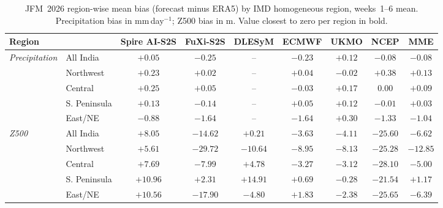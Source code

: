     \begin{table}[t]\centering
    \footnotesize
    \setlength{\tabcolsep}{3pt}
    \caption{JFM~2026 region-wise mean bias (forecast minus ERA5) by IMD homogeneous region, weeks~1--6 mean. Precipitation bias in mm\,day$^{-1}$; Z500 bias in m. Value closest to zero per region in bold.}
    \label{tab:reg_bias}
    \begin{tabular}{llccccccc}\toprule
    Region & & Spire AI-S2S & FuXi-S2S & DLESyM & ECMWF & UKMO & NCEP & MME \\
    \midrule
    \multirow{5}{*}{\emph{Precipitation}} & All India    & $\mathbf{+0.05}$ & $-0.25$ & -- & $-0.23$ & $+0.12$ & $-0.08$ & $-0.08$ \\
 & Northwest    & $+0.23$ & $\mathbf{+0.02}$ & -- & $+0.04$ & $-0.02$ & $+0.38$ & $+0.13$ \\
 & Central      & $+0.25$ & $+0.05$ & -- & $-0.03$ & $+0.17$ & $\mathbf{0.00}$ & $+0.09$ \\
 & S. Peninsula & $+0.13$ & $-0.14$ & -- & $+0.05$ & $+0.12$ & $\mathbf{-0.01}$ & $+0.03$ \\
 & East/NE      & $-0.88$ & $-1.64$ & -- & $-1.64$ & $\mathbf{+0.30}$ & $-1.33$ & $-1.04$ \\
\midrule
\multirow{5}{*}{\emph{Z500}} & All India    & $+8.05$ & $-14.62$ & $\mathbf{+0.21}$ & $-3.63$ & $-4.11$ & $-25.60$ & $-6.62$ \\
 & Northwest    & $\mathbf{+5.61}$ & $-29.72$ & $-10.64$ & $-8.95$ & $-8.13$ & $-25.28$ & $-12.85$ \\
 & Central      & $+7.69$ & $-7.99$ & $+4.78$ & $-3.27$ & $\mathbf{-3.12}$ & $-28.10$ & $-5.00$ \\
 & S. Peninsula & $+10.96$ & $+2.31$ & $+14.91$ & $+0.69$ & $\mathbf{-0.28}$ & $-21.54$ & $+1.17$ \\
 & East/NE      & $+10.56$ & $-17.90$ & $-4.80$ & $\mathbf{+1.83}$ & $-2.38$ & $-25.65$ & $-6.39$ \\
    \bottomrule
    \end{tabular}\end{table}
